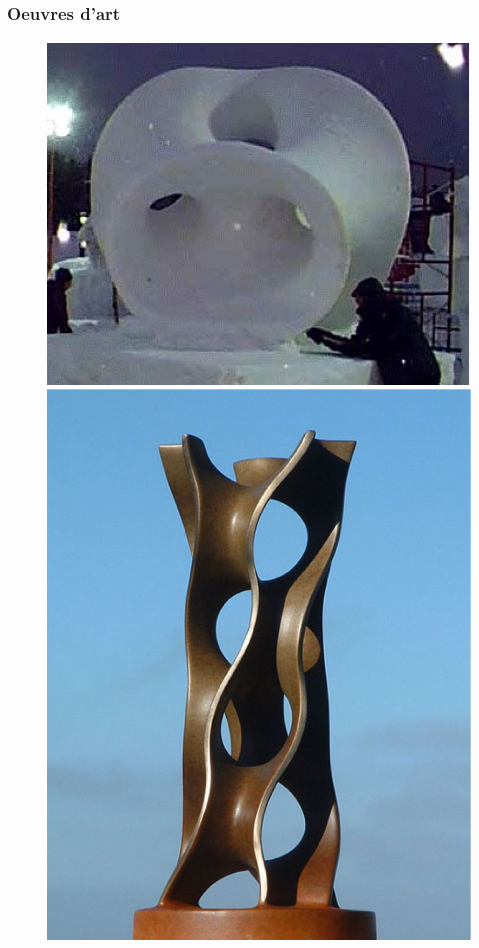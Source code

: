\documentclass{beamer}
\begin{document}
\begin {frame}
\frametitle{Oeuvres d'art}
\begin{figure}[h!]
   \begin{minipage}[b]{0.45\linewidth}
      \centering\includegraphics[scale=0.45]{costaice.eps}
   \end{minipage}
    \begin{minipage}[b]{0.50\linewidth}   
     \centering\includegraphics[scale=0.08]{scherktower.eps}

\end{minipage}
\end{figure}
\end{frame}
\end{document}
